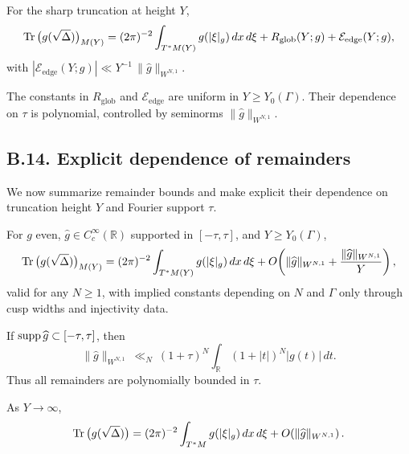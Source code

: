 \begin{corollary}
\label{cor:B-sharpglobal}
For the sharp truncation at height $Y$,
\[
\operatorname{Tr}\big(g(\sqrt\Delta)\big)_{M(Y)}
=(2\pi)^{-2}\int_{T^*M(Y)} g(|\xi|_g)\,dx\,d\xi
+R_{\mathrm{glob}}(Y;g)+\mathcal E_{\mathrm{edge}}(Y;g),
\]
with $|\mathcal E_{\mathrm{edge}}(Y;g)|\ll Y^{-1}\,\|\widehat g\|_{W^{N,1}}$.
\end{corollary}

\begin{remark}
The constants in $R_{\mathrm{glob}}$ and $\mathcal E_{\mathrm{edge}}$ are uniform
in $Y\ge Y_0(\Gamma)$. Their dependence on $\tau$ is polynomial, controlled
by seminorms $\|\widehat g\|_{W^{N,1}}$.
\end{remark}

\subsection*{B.14. Explicit dependence of remainders}
\label{subsec:B14-remainders}

We now summarize remainder bounds and make explicit their dependence
on truncation height $Y$ and Fourier support $\tau$.

\begin{proposition}
\label{prop:B-remainderbounds}
For $g$ even, $\widehat g\in C_c^\infty(\mathbb R)$ supported in $[-\tau,\tau]$,
and $Y\ge Y_0(\Gamma)$,
\[
\operatorname{Tr}\big(g(\sqrt\Delta)\big)_{M(Y)}
=(2\pi)^{-2}\int_{T^*M(Y)} g(|\xi|_g)\,dx\,d\xi
+O\!\left(\|\widehat g\|_{W^{N,1}}+\frac{\|\widehat g\|_{W^{N,1}}}{Y}\right),
\]
valid for any $N\ge1$, with implied constants depending on $N$ and $\Gamma$
only through cusp widths and injectivity data.
\end{proposition}

\begin{remark}
\label{rmk:B-tauscaling}
If $\operatorname{supp}\widehat g\subset[-\tau,\tau]$, then
\[
\|\widehat g\|_{W^{N,1}}
\ \ll_N\ (1+\tau)^N \int_{\mathbb R} (1+|t|)^N |g(t)|\,dt.
\]
Thus all remainders are polynomially bounded in $\tau$.
\end{remark}

\begin{corollary}
\label{cor:B-asympt}
As $Y\to\infty$,
\[
\operatorname{Tr}\big(g(\sqrt\Delta)\big)
=(2\pi)^{-2}\int_{T^*M} g(|\xi|_g)\,dx\,d\xi
+O\!\left(\|\widehat g\|_{W^{N,1}}\right).
\]
\end{corollary}

